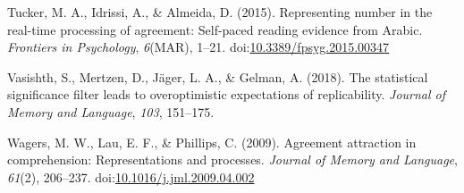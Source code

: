 \documentclass[doc]{apa6}
\begin{document}
\leavevmode\hypertarget{ref-TuckerEtAl:2015}{}%
Tucker, M. A., Idrissi, A., \& Almeida, D. (2015). Representing number in the real-time processing of agreement: Self-paced reading evidence from Arabic. \emph{Frontiers in Psychology}, \emph{6}(MAR), 1--21. doi:\href{https://doi.org/10.3389/fpsyg.2015.00347}{10.3389/fpsyg.2015.00347}

\leavevmode\hypertarget{ref-Vasishth2018}{}%
Vasishth, S., Mertzen, D., Jäger, L. A., \& Gelman, A. (2018). The statistical significance filter leads to overoptimistic expectations of replicability. \emph{Journal of Memory and Language}, \emph{103}, 151--175.

\leavevmode\hypertarget{ref-WagersEtAl:2009}{}%
Wagers, M. W., Lau, E. F., \& Phillips, C. (2009). Agreement attraction in comprehension: Representations and processes. \emph{Journal of Memory and Language}, \emph{61}(2), 206--237. doi:\href{https://doi.org/10.1016/j.jml.2009.04.002}{10.1016/j.jml.2009.04.002}
\end{document}
